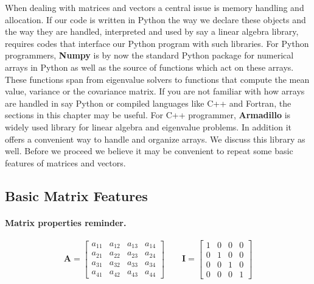 \documentclass[%
oneside,                 %
final,                   %
10pt]{article}
\begin{document}
\noindent
When dealing with matrices and vectors a central issue is memory
handling and allocation. If our code is written in Python the way we
declare these objects and the way they are handled, interpreted and
used by say a linear algebra library, requires codes that interface
our Python program with such libraries. For Python programmers,
\textbf{Numpy} is by now the standard Python package for numerical arrays in
Python as well as the source of functions which act on these
arrays. These functions span from eigenvalue solvers to functions that
compute the mean value, variance or the covariance matrix. If you are
not familiar with how arrays are handled in say Python or compiled
languages like C++ and Fortran, the sections in this chapter may be
useful. For C++ programmer, \textbf{Armadillo} is widely used library for
linear algebra and eigenvalue problems. In addition it offers a
convenient way to handle and organize arrays. We discuss this library
as well.   Before we proceed we believe  it may be convenient to repeat some basic features of 
 matrices and vectors.


\subsection{Basic Matrix Features}


\paragraph{Matrix properties reminder.}
\[
 \mathbf{A} =
      \begin{bmatrix} a_{11} & a_{12} & a_{13} & a_{14} \\
                                 a_{21} & a_{22} & a_{23} & a_{24} \\
                                   a_{31} & a_{32} & a_{33} & a_{34} \\
                                  a_{41} & a_{42} & a_{43} & a_{44}
             \end{bmatrix}\qquad
\mathbf{I} =
      \begin{bmatrix} 1 & 0 & 0 & 0 \\
                                 0 & 1 & 0 & 0 \\
                                 0 & 0 & 1 & 0 \\
                                 0 & 0 & 0 & 1
             \end{bmatrix}
\]
\end{document}
